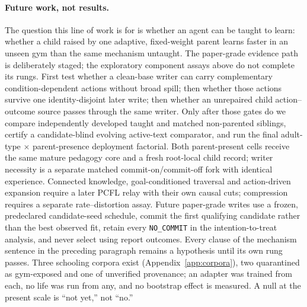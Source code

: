 \documentclass{article}
\begin{document}
\paragraph{Future work, not results.} The question this line of work is for is whether an agent can be taught to learn: whether a child raised by one adaptive, fixed-weight parent learns faster in an unseen gym than the same mechanism untaught. The paper-grade evidence path is deliberately staged; the exploratory component assays above do not complete its rungs. First test whether a clean-base writer can carry complementary condition-dependent actions without broad spill; then whether those actions survive one identity-disjoint later write; then whether an unrepaired child action--outcome source passes through the same writer. Only after those gates do we compare independently developed taught and matched non-parented siblings, certify a candidate-blind evolving active-text comparator, and run the final adult-type $\times$ parent-presence deployment factorial. Both parent-present cells receive the same mature pedagogy core and a fresh root-local child record; writer necessity is a separate matched commit-on/commit-off fork with identical experience. Connected knowledge, goal-conditioned traversal and action-driven expansion require a later PCFL relay with their own causal cuts; compression requires a separate rate--distortion assay. Future paper-grade writes use a frozen, predeclared candidate-seed schedule, commit the first qualifying candidate rather than the best observed fit, retain every \texttt{NO\_COMMIT} in the intention-to-treat analysis, and never select using report outcomes. Every clause of the mechanism sentence in the preceding paragraph remains a hypothesis until its own rung passes. Three schooling corpora exist (Appendix~\ref{app:corpora}), two quarantined as gym-exposed and one of unverified provenance; an adapter was trained from each, no life was run from any, and no bootstrap effect is measured. A null at the present scale is ``not yet,'' not ``no.''

\end{document}
